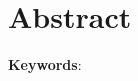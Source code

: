 %
%
\chapter*{Abstract}
\thispagestyle{empty}

\lipsum[1]

\vspace{0.5cm}

\textbf{Keywords}:  \keywords
